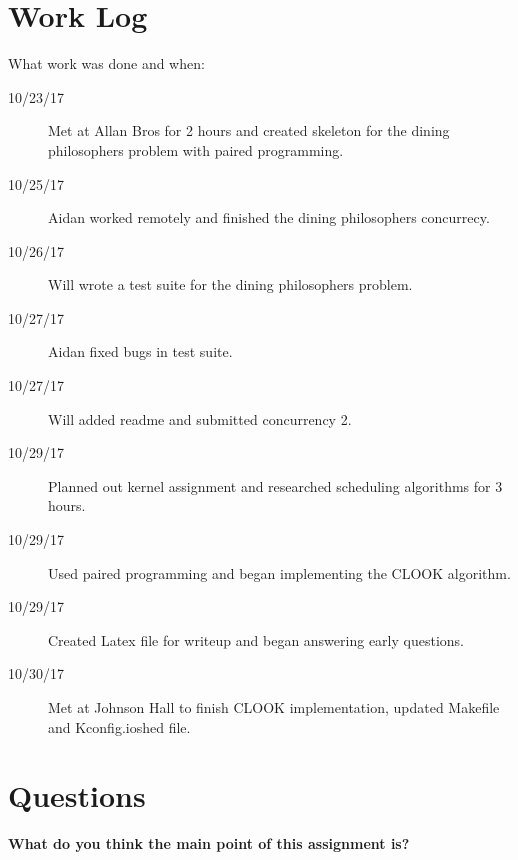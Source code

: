 \documentclass[10pt,letterpaper,draftclsnofoot,onecolumn]{IEEEtran}
\begin{document}
\section{Work Log}
\noindent What work was done and when:
\begin{description}
\item [10/23/17] Met at Allan Bros for 2 hours and created skeleton for the dining philosophers problem with paired programming.
\item [10/25/17] Aidan worked remotely and finished the dining philosophers concurrecy.
\item [10/26/17] Will wrote a test suite for the dining philosophers problem.
\item [10/27/17] Aidan fixed bugs in test suite.
\item [10/27/17] Will added readme and submitted concurrency 2.
\item [10/29/17] Planned out kernel assignment and researched scheduling algorithms for 3 hours.
\item [10/29/17] Used paired programming and began implementing the CLOOK algorithm.
\item [10/29/17] Created Latex file for writeup and began answering early questions.
\item [10/30/17] Met at Johnson Hall to finish CLOOK implementation, updated Makefile and Kconfig.ioshed file.

\end{description}

\section{Questions}

\noindent\textbf{What do you think the main point of this assignment is?}

\end{document}
